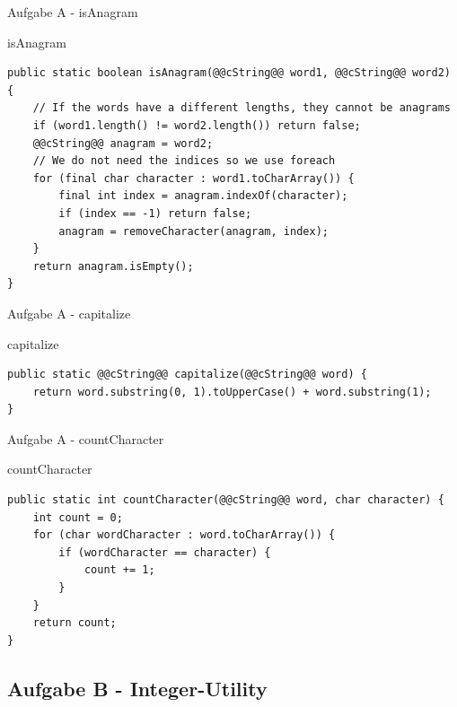 \documentclass[aspectratio=169]{beamer}
\begin{document}
\begin{frame}[fragile]{Aufgabe A - isAnagram}
  \begin{block}{isAnagram}
    \begin{lstlisting}
public static boolean isAnagram(@@cString@@ word1, @@cString@@ word2) {
    // If the words have a different lengths, they cannot be anagrams
    if (word1.length() != word2.length()) return false;
    @@cString@@ anagram = word2;
    // We do not need the indices so we use foreach
    for (final char character : word1.toCharArray()) {
        final int index = anagram.indexOf(character);
        if (index == -1) return false;
        anagram = removeCharacter(anagram, index);
    }
    return anagram.isEmpty();
}
    \end{lstlisting}
  \end{block}
\end{frame}

\begin{frame}[fragile]{Aufgabe A - capitalize}
  \begin{block}{capitalize}
    \begin{lstlisting}
public static @@cString@@ capitalize(@@cString@@ word) {
    return word.substring(0, 1).toUpperCase() + word.substring(1);
}
    \end{lstlisting}
  \end{block}
\end{frame}

\begin{frame}[fragile]{Aufgabe A - countCharacter}
  \begin{block}{countCharacter}
    \begin{lstlisting}
public static int countCharacter(@@cString@@ word, char character) {
    int count = 0;
    for (char wordCharacter : word.toCharArray()) {
        if (wordCharacter == character) {
            count += 1;
        }
    }
    return count;
}
    \end{lstlisting}
  \end{block}
\end{frame}




\subsection{Aufgabe B - Integer-Utility}
\end{document}
